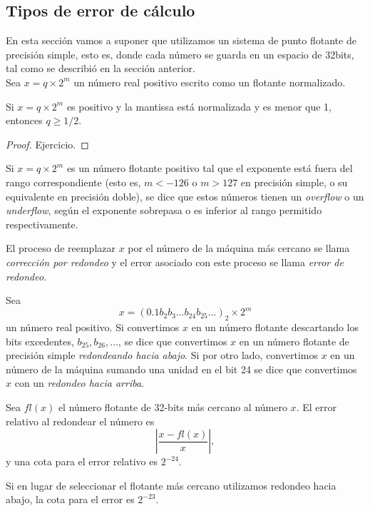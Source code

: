 \documentclass[spanish]{amsart}
\begin{document}
\subsection{Tipos de error de cálculo}

En esta sección vamos a suponer que utilizamos un sistema de punto flotante de precisión simple, esto es, donde cada número se guarda en un espacio de 32bits, tal como se describió en la sección anterior.\\

Sea $x = q \times 2^m$ un número real positivo escrito como un flotante normalizado.

\begin{proposition}
  Si $x = q \times 2^m$ es positivo y la mantissa está normalizada y es menor que 1, entonces $q \geq 1/2$.
\end{proposition}

\begin{proof}
  Ejercicio.
\end{proof}

\begin{definition}
Si $x = q \times 2^m$ es un número flotante positivo tal que el exponente está fuera del rango correspondiente (esto es, $m < -126$ o $m > 127$ en precisión simple, o su equivalente en precisión doble), se dice que estos números tienen un \emph{overflow} o un \emph{underflow}, según el exponente sobrepasa o es inferior al rango permitido respectivamente.  
\end{definition}

\begin{definition}
  El proceso de reemplazar $x$ por el número de la máquina más cercano se llama \emph{corrección por redondeo} y el error asociado con este proceso se llama \emph{error de redondeo}.
\end{definition}

\begin{definition}
  Sea 
\[x = (0.1b_2b_3\ldots b_{24}b_{25}\ldots)_2\times 2^m\]
un número real positivo. Si convertimos $x$ en un número flotante descartando los bits excedentes, $b_{25}, b_{26}, \ldots$, se dice que convertimos $x$ en un número flotante de precisión simple \emph{redondeando hacia abajo}. Si por otro lado, convertimos $x$ en un número de la máquina sumando una unidad en el bit 24 se dice que convertimos $x$ con un \emph{redondeo hacia arriba}.
\end{definition}

\begin{theorem}
  Sea $fl(x)$ el número flotante de 32-bits más cercano al número $x$. El error relativo al redondear el número es 
\[\left|\frac{x - fl(x)}{x}\right|,\]
y una cota para el error relativo es $2^{-24}$.
\end{theorem}

\begin{theorem}
  Si en lugar de seleccionar el flotante más cercano utilizamos redondeo hacia abajo, la cota para el error es $2^{-23}$.
\end{theorem}



\nocite{*}
{}

\end{document}
